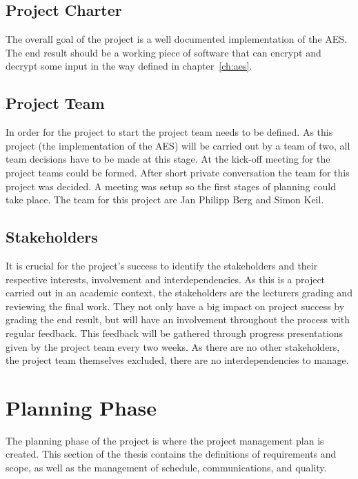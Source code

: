 \subsection{Project Charter}
\label{ch:projectcharter}
\begin{tcolorbox}
  The overall goal of the project is a well documented implementation of the \ac{AES}. The end result should be a working piece of software that can encrypt and decrypt some input in the way defined in chapter~\ref{ch:aes}.
\end{tcolorbox}


\subsection{Project Team}
\label{ch:projectteam}
In order for the project to start the project team needs to be defined. As this project (the implementation of the \ac{AES}) will be carried out by a team of two, all team decisions have to be made at this stage. At the kick-off meeting for the project teams could be formed. After short private conversation the team for this project was decided. A meeting was setup so the first stages of planning could take place. The team for this project are Jan Philipp Berg and Simon Keil.

\subsection{Stakeholders}
\label{ch:stakeholders}
It is crucial for the project's success to identify the stakeholders and their respective interests, involvement and interdependencies. As this is a project carried out in an academic context, the stakeholders are the lecturers grading and reviewing the final work. They not only have a big impact on project success by grading the end result, but will have an involvement throughout the process with regular feedback. This feedback will be gathered through progress presentations given by the project team every two weeks. As there are no other stakeholders, the project team themselves excluded, there are no interdependencies to manage.


\section{Planning Phase}
\label{ch:planningphase}
The planning phase of the project is where the project management plan is created. This section of the thesis contains the definitions of requirements and scope, as well as the management of schedule, communications, and quality.

